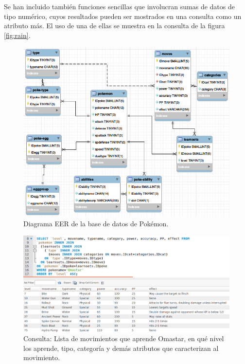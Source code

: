 \documentclass{scrartcl}
\begin{document}
Se han incluido también funciones sencillas que involucran sumas de datos de tipo numérico, cuyos resultados pueden ser mostrados en una consulta como un atributo más. El uso de una de ellas se muestra en la consulta de la figura \ref{fig:rain}.\par
\begin{figure}[ht]
\centering
\includegraphics[scale=0.6]{diagramadb}
\caption{Diagrama EER de la base de datos de Pokémon.}
\label{fig:diagrama}
\end{figure}

\begin{figure}[ht]
\centering
\includegraphics[scale=0.45]{consultahelix}
\caption{Consulta: Lista de movimientos que aprende Omastar, en qué nivel los aprende, tipo, categoría y demás atributos que caracterizan al movimiento.}
\label{fig:helix}
\end{figure}
\end{document}

